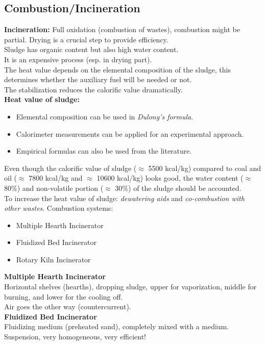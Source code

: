 \documentclass[12pt]{article}
\begin{document}
\subsection{Combustion/Incineration}
\textbf{Incineration:} Full oxidation (combustion of wastes), combustion might be partial. Drying is a crucial step to provide efficiency.\\
Sludge has organic content but also high water content. \\
It is an expensive process (esp. in drying part).\\
The heat value depends on the elemental composition of the sludge, this determines whether the auxiliary fuel will be needed or not.\\
The stabilization reduces the calorific value dramatically.\\
\textbf{Heat value of sludge:}
\begin{itemize}
    \item Elemental composition can be used in \textsl{Dulong's formula}.
    \item Calorimeter measurements can be applied for an experimental approach.
    \item Empirical formulas can also be used from the literature.
\end{itemize}
Even though the calorific value of sludge ($\approx$ 5500 kcal/kg) compared to coal and oil ($\approx$ 7800 kcal/kg and $\approx$ 10600 kcal/kg) looks good, the water content ($\approx$ 80\%) and non-volatile portion ($\approx$ 30\%) of the sludge should be accounted.\\
To increase the heat value of sludge: \textsl{dewatering aids} and \textsl{co-combustion with other wastes}.
Combustion systems:
\begin{itemize}
    \item Multiple Hearth Incinerator
    \item Fluidized Bed Incinerator
    \item Rotary Kiln Incinerator
\end{itemize}
\textbf{Multiple Hearth Incinerator}\\
Horizontal shelves (hearths), dropping sludge, upper for vaporization, middle for burning, and lower for the cooling off.\\
Air goes the other way (countercurrent).\\
\textbf{Fluidized Bed Incinerator}\\
Fluidizing medium (preheated sand), completely mixed with a medium. Suspension, very homogeneous, very efficient!\\
\end{document}
